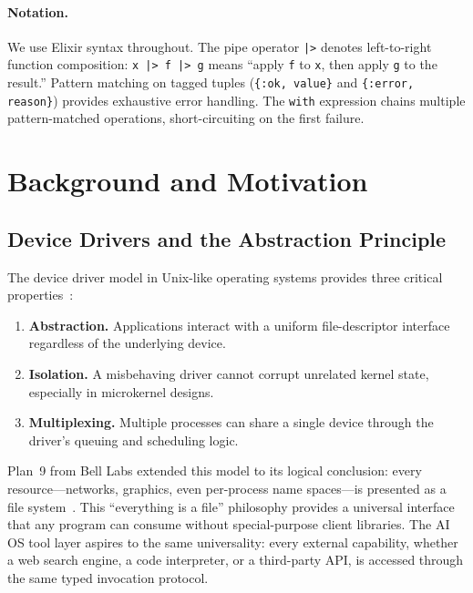 \documentclass[12pt,a4paper]{article}
\theoremstyle{plain}
\theoremstyle{definition}
\begin{document}
\paragraph{Notation.} We use Elixir syntax throughout. The pipe operator \texttt{|>} denotes left-to-right function composition: \texttt{x |> f |> g} means ``apply \texttt{f} to \texttt{x}, then apply \texttt{g} to the result.'' Pattern matching on tagged tuples (\texttt{\{:ok, value\}} and \texttt{\{:error, reason\}}) provides exhaustive error handling. The \texttt{with} expression chains multiple pattern-matched operations, short-circuiting on the first failure.


\section{Background and Motivation}
\label{sec:background}

\subsection{Device Drivers and the Abstraction Principle}

The device driver model in Unix-like operating systems provides three critical properties~\citep{love2010linux}:

\begin{enumerate}[leftmargin=2em]
\item \textbf{Abstraction.} Applications interact with a uniform file-descriptor interface regardless of the underlying device.
\item \textbf{Isolation.} A misbehaving driver cannot corrupt unrelated kernel state, especially in microkernel designs.
\item \textbf{Multiplexing.} Multiple processes can share a single device through the driver's queuing and scheduling logic.
\end{enumerate}

Plan~9 from Bell Labs extended this model to its logical conclusion: every resource---networks, graphics, even per-process name spaces---is presented as a file system~\citep{pike1995plan9}. This ``everything is a file'' philosophy provides a universal interface that any program can consume without special-purpose client libraries. The AI OS tool layer aspires to the same universality: every external capability, whether a web search engine, a code interpreter, or a third-party API, is accessed through the same typed invocation protocol.
\end{document}
